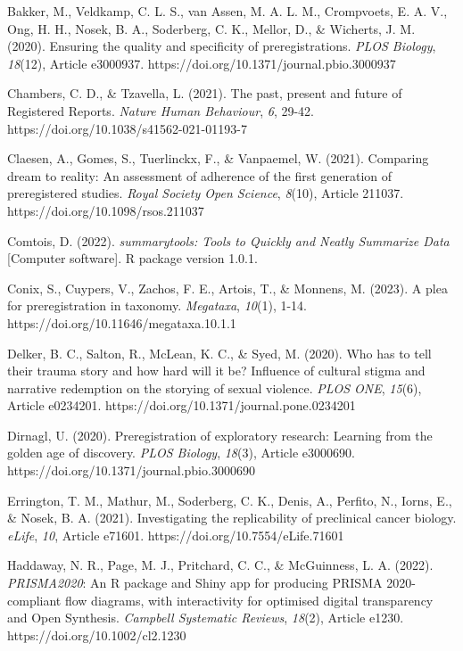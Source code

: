 \documentclass[authordate, empirical]{jote-new-article}
\begin{document}
	\indent Bakker, M., Veldkamp, C. L. S., van Assen, M. A. L. M., Crompvoets, E. A. V., Ong, H. H., Nosek, B. A., Soderberg, C. K., Mellor, D., \& Wicherts, J. M. (2020). Ensuring the quality and specificity of preregistrations. \emph{PLOS Biology}, \emph{18}(12), Article e3000937. https://doi.org/10.1371/journal.pbio.3000937



	Chambers, C. D., \& Tzavella, L. (2021). The past, present and future of Registered Reports. \emph{Nature Human Behaviour}, \emph{6}, 29-42. https://doi.org/10.1038/s41562-021-01193-7



	Claesen, A., Gomes, S., Tuerlinckx, F., \& Vanpaemel, W. (2021). Comparing dream to reality: An assessment of adherence of the first generation of preregistered studies. \emph{Royal Society Open Science}, \emph{8}(10), Article 211037. https://doi.org/10.1098/rsos.211037



	Comtois, D. (2022). \emph{summarytools: Tools to Quickly and Neatly Summarize Data} [Computer software]. R package version 1.0.1.



	Conix, S., Cuypers, V., Zachos, F. E., Artois, T., \& Monnens, M. (2023). A plea for preregistration in taxonomy. \emph{Megataxa}, \emph{10}(1), 1-14. https://doi.org/10.11646/megataxa.10.1.1



	Delker, B. C., Salton, R., McLean, K. C., \& Syed, M. (2020). Who has to tell their trauma story and how hard will it be? Influence of cultural stigma and narrative redemption on the storying of sexual violence. \emph{PLOS ONE}, \emph{15}(6), Article e0234201. https://doi.org/10.1371/journal.pone.0234201



	Dirnagl, U. (2020). Preregistration of exploratory research: Learning from the golden age of discovery. \emph{PLOS Biology}, \emph{18}(3), Article e3000690. https://doi.org/10.1371/journal.pbio.3000690



	Errington, T. M., Mathur, M., Soderberg, C. K., Denis, A., Perfito, N., Iorns, E., \& Nosek, B. A. (2021). Investigating the replicability of preclinical cancer biology. \emph{eLife}, \emph{10}, Article e71601. https://doi.org/10.7554/eLife.71601



	Haddaway, N. R., Page, M. J., Pritchard, C. C., \& McGuinness, L. A. (2022). \emph{PRISMA2020}: An R package and Shiny app for producing PRISMA 2020-compliant flow diagrams, with interactivity for optimised digital transparency and Open Synthesis. \emph{Campbell Systematic Reviews}, \emph{18}(2), Article e1230. https://doi.org/10.1002/cl2.1230
\end{document}
